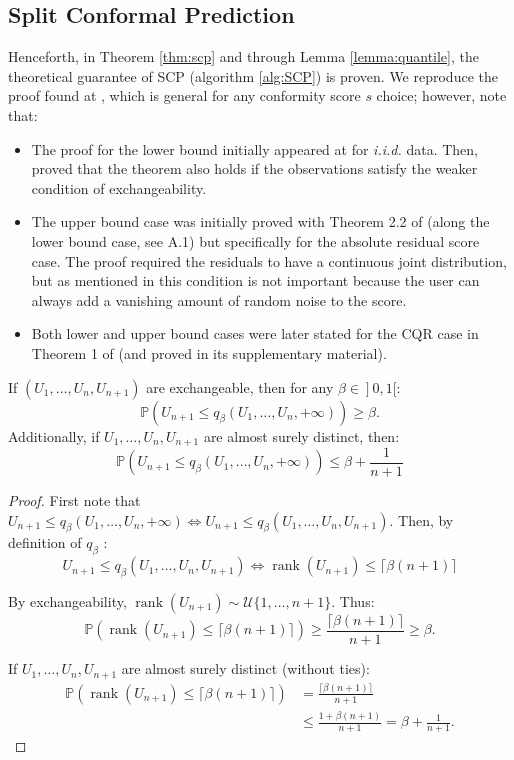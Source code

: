 \subsection{Split Conformal Prediction}\label{guarantees:scp}

Henceforth, in Theorem \ref{thm:scp} and through Lemma \ref{lemma:quantile}, the theoretical guarantee of SCP (algorithm \ref{alg:SCP}) is proven. We reproduce the proof found at \cite{cptuto}, which is general for any conformity score $s$ choice; however, note that:
\begin{itemize}
    \item The proof for the lower bound initially appeared at \cite{papadopoulos} for \textit{i.i.d.} data. Then, \cite{vovk2005} proved that the theorem also holds if the observations satisfy the weaker condition of exchangeability.
    \item The upper bound case was initially proved with Theorem 2.2 of \cite{lei2018} (along the lower bound case, see A.1) but specifically for the absolute residual score case. The proof required the residuals to have a continuous joint distribution, but as mentioned in \cite{gentleintro} this condition is not important because the user can always add a vanishing amount of random noise to the score. 
    \item Both lower and upper bound cases were later stated for the CQR case in Theorem 1 of \cite{romano2019} (and proved in its supplementary material).
\end{itemize}

\begin{lemma}\label{lemma:quantile}
    If $\left(U_1, \ldots, U_n, U_{n+1}\right)$ are exchangeable, then for any $\left.\beta \in\right] 0,1[$: $$ \mathbb{P}\left(U_{n+1} \leq q_\beta\left(U_1, \ldots, U_n,+\infty\right)\right) \geq \beta . $$
    Additionally, if $U_1, \ldots, U_n, U_{n+1}$ are almost surely distinct, then:
$$ \mathbb{P}\left(U_{n+1} \leq q_\beta\left(U_1, \ldots, U_n,+\infty\right)\right) \leq \beta+\frac{1}{n+1} $$
\end{lemma}
\begin{proof}
    First note that $U_{n+1} \leq q_\beta\left(U_1, \ldots, U_n,+\infty\right) \Longleftrightarrow U_{n+1} \leq q_\beta\left(U_1, \ldots, U_n, U_{n+1}\right)$.
Then, by definition of $q_\beta$ :
$$
U_{n+1} \leq q_\beta\left(U_1, \ldots, U_n, U_{n+1}\right) \Longleftrightarrow \operatorname{rank}\left(U_{n+1}\right) \leq\lceil\beta(n+1)\rceil
$$

By exchangeability, $\operatorname{rank}\left(U_{n+1}\right) \sim \mathcal{U}\{1, \ldots, n+1\}$. Thus:
$$
\mathbb{P}\left(\operatorname{rank}\left(U_{n+1}\right) \leq\lceil\beta(n+1)\rceil\right) \geq \frac{\lceil\beta(n+1)\rceil}{n+1} \geq \beta .
$$

If $U_1, \ldots, U_n, U_{n+1}$ are almost surely distinct (without ties):
$$
\begin{aligned}
\mathbb{P}\left(\operatorname{rank}\left(U_{n+1}\right) \leq\lceil\beta(n+1)\rceil\right) & =\frac{\lceil\beta(n+1)\rceil}{n+1} \\
& \leq \frac{1+\beta(n+1)}{n+1}=\beta+\frac{1}{n+1} . \end{aligned}
$$
\end{proof}

